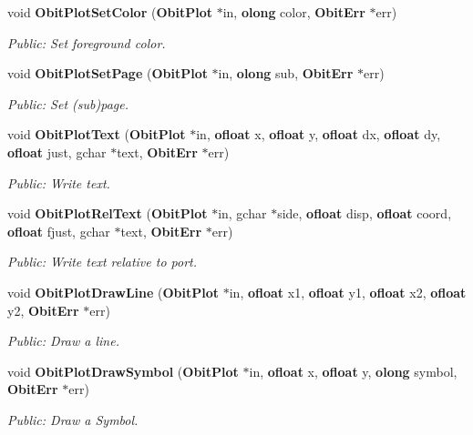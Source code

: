 \begin{CompactItemize}
void {\bf Obit\-Plot\-Set\-Color} ({\bf Obit\-Plot} $\ast$in, {\bf olong} color, {\bf Obit\-Err} $\ast$err)
\begin{CompactList}\small\item\em Public: Set foreground color. \item\end{CompactList}\item 
void {\bf Obit\-Plot\-Set\-Page} ({\bf Obit\-Plot} $\ast$in, {\bf olong} sub, {\bf Obit\-Err} $\ast$err)
\begin{CompactList}\small\item\em Public: Set (sub)page. \item\end{CompactList}\item 
void {\bf Obit\-Plot\-Text} ({\bf Obit\-Plot} $\ast$in, {\bf ofloat} x, {\bf ofloat} y, {\bf ofloat} dx, {\bf ofloat} dy, {\bf ofloat} just, gchar $\ast$text, {\bf Obit\-Err} $\ast$err)
\begin{CompactList}\small\item\em Public: Write text. \item\end{CompactList}\item 
void {\bf Obit\-Plot\-Rel\-Text} ({\bf Obit\-Plot} $\ast$in, gchar $\ast$side, {\bf ofloat} disp, {\bf ofloat} coord, {\bf ofloat} fjust, gchar $\ast$text, {\bf Obit\-Err} $\ast$err)
\begin{CompactList}\small\item\em Public: Write text relative to port. \item\end{CompactList}\item 
void {\bf Obit\-Plot\-Draw\-Line} ({\bf Obit\-Plot} $\ast$in, {\bf ofloat} x1, {\bf ofloat} y1, {\bf ofloat} x2, {\bf ofloat} y2, {\bf Obit\-Err} $\ast$err)
\begin{CompactList}\small\item\em Public: Draw a line. \item\end{CompactList}\item 
void {\bf Obit\-Plot\-Draw\-Symbol} ({\bf Obit\-Plot} $\ast$in, {\bf ofloat} x, {\bf ofloat} y, {\bf olong} symbol, {\bf Obit\-Err} $\ast$err)
\begin{CompactList}\small\item\em Public: Draw a Symbol. \item\end{CompactList}\item 

\end{CompactItemize}
